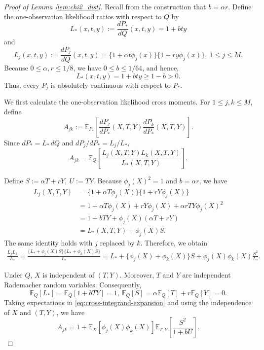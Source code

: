 \documentclass[11pt]{article}
\begin{document}
\begin{proof}[Proof of Lemma \ref{lem:chi2_dist}]
Recall from the construction that \(b=\alpha r\).  Define the
one-observation likelihood ratios with respect to \(Q\) by
\[
L_*(x,t,y)
:=
\frac{dP_*}{dQ}(x,t,y)
=
1+bty
\]
and
\[
L_j(x,t,y)
:=
\frac{dP_j}{dQ}(x,t,y)
=
\{1+\alpha t\phi_j(x)\}
\{1+ry\phi_j(x)\},
\ 1\leq j\leq M.
\]
Because \(0\leq\alpha,r\leq1/8\), we have
\(0\leq b\leq1/64\), and hence,
\[
L_*(x,t,y)=1+bty\geq1-b>0.
\]
Thus, every \(P_j\) is absolutely continuous with respect to \(P_*\).

We first calculate the one-observation likelihood cross moments.  For
\(1\leq j,k\leq M\), define
\[
A_{jk}
:=
\mathbb E_{P_*}
\left[
\frac{dP_j}{dP_*}(X,T,Y)
\frac{dP_k}{dP_*}(X,T,Y)
\right].
\]
Since \(dP_*=L_*\,dQ\) and \(dP_j/dP_*=L_j/L_*\),
\begin{equation}
A_{jk}
=
\mathbb E_Q
\left[
\frac{L_j(X,T,Y)L_k(X,T,Y)}
     {L_*(X,T,Y)}
\right].
\label{eq:one-observation-cross-moment}
\end{equation}

Define $S:=\alpha T+rY,
\ 
U:=TY$. Because \(\phi_j(X)^2=1\) and \(b=\alpha r\), we have
\begin{align}
L_j(X,T,Y)
&=
\{1+\alpha T\phi_j(X)\}
\{1+rY\phi_j(X)\}
\nonumber\\
&=
1+\alpha T\phi_j(X)+rY\phi_j(X)
+\alpha rTY\phi_j(X)^2
\nonumber\\
&=
1+bTY+\phi_j(X)(\alpha T+rY)
\nonumber\\
&=
L_*(X,T,Y)+\phi_j(X)S.
\label{eq:likelihood-decomposition}
\end{align}
The same identity holds with \(j\) replaced by \(k\).  Therefore, we obtain
\begin{align}
\frac{L_jL_k}{L_*}
=
\frac{
\{L_*+\phi_j(X)S\}
\{L_*+\phi_k(X)S\}
}{L_*}
=
L_*
+\{\phi_j(X)+\phi_k(X)\}S
+\phi_j(X)\phi_k(X)\frac{S^2}{L_*}.
\label{eq:cross-integrand-expansion}
\end{align}

Under \(Q\), \(X\) is independent of \((T,Y)\).  Moreover, \(T\) and \(Y\)
are independent Rademacher random variables.  Consequently,
\[
\mathbb E_Q[L_*]
=
\mathbb E_Q[1+bTY]
=1,
\ 
\mathbb E_Q[S]
=
\alpha\mathbb E_Q[T]+r\mathbb E_Q[Y]
=0.
\]
Taking expectations in \eqref{eq:cross-integrand-expansion} and using the
independence of \(X\) and \((T,Y)\), we have
\begin{equation}
A_{jk}
=
1+
\mathbb E_X[\phi_j(X)\phi_k(X)]
\mathbb E_{T,Y}
\left[
\frac{S^2}{1+bU}
\right].
\label{eq:cross-moment-reduced}
\end{equation}


\end{proof}
\end{document}
